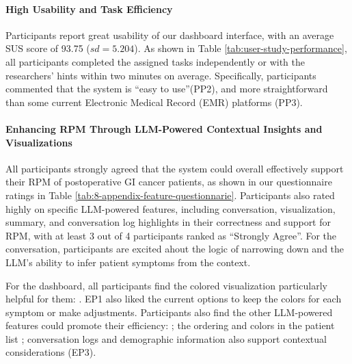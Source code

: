 \paragraph{High Usability and Task Efficiency}
Participants report great usability of our dashboard interface, with an average SUS score of 93.75 ($sd=5.204$). As shown in Table \ref{tab:user-study-performance}, all participants completed the assigned tasks independently or with the researchers' hints within two minutes on average. 
Specifically, participants commented that the system is ``easy to use''(PP2), and more straightforward than some current Electronic Medical Record (EMR) platforms (PP3). 


        

\paragraph{Enhancing RPM Through LLM-Powered Contextual Insights and Visualizations}
All participants strongly agreed that the system could overall effectively support their RPM of postoperative GI cancer patients, as shown in our questionnaire ratings in Table \ref{tab:8-appendix-feature-questionnarie}. Participants also rated highly on specific LLM-powered features, including conversation, visualization, summary, and conversation log highlights in their correctness and support for RPM, with at least 3 out of 4 participants ranked as ``Strongly Agree''.
For the conversation, participants are excited ahout the logic of narrowing down and the LLM's ability to infer patient symptoms from the context.

For the dashboard, all participants find the colored visualization particularly helpful for them:
. EP1 also liked the current options to keep the colors for each symptom or make adjustments. Participants also find the other LLM-powered features could promote their efficiency: ; the ordering and colors in the patient list ; conversation logs and demographic information also support contextual considerations (EP3).

